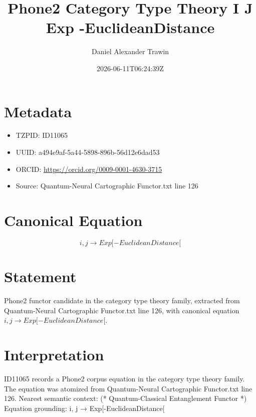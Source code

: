 \documentclass[11pt]{article}
\title{Phone2 Category Type Theory I J Exp -EuclideanDistance}
\author{Daniel Alexander Trawin}
\date{2026-06-11T06:24:39Z}
\begin{document}
\maketitle
\section*{Metadata}
\begin{itemize}
\item TZPID: ID11065
\item UUID: a494e9af-5a44-5898-896b-56d12e6dad53
\item ORCID: \url{https://orcid.org/0009-0001-4630-3715}
\item Source: Quantum-Neural Cartographic Functor.txt line 126
\end{itemize}
\section*{Canonical Equation}
\[
{i, j} → Exp[-EuclideanDistance[
\]
\section*{Statement}
Phone2 functor candidate in the category type theory family, extracted from Quantum-Neural Cartographic Functor.txt line 126, with canonical equation ${i, j} → Exp[-EuclideanDistance[$.
\section*{Interpretation}
ID11065 records a Phone2 corpus equation in the category type theory family. The equation was atomized from Quantum-Neural Cartographic Functor.txt line 126. Nearest semantic context: (* Quantum-Classical Entanglement Functor *) Equation grounding: {i, j} → Exp[-EuclideanDistance[
\end{document}
